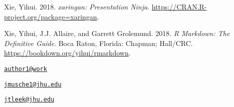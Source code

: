 \leavevmode\hypertarget{ref-xaringan}{}%
Xie, Yihui. 2018. \emph{xaringan: Presentation Ninja}.
\url{https://CRAN.R-project.org/package=xaringan}.

\leavevmode\hypertarget{ref-rmarkdownbook}{}%
Xie, Yihui, J.J. Allaire, and Garrett Grolemund. 2018. \emph{R Markdown:
The Definitive Guide}. Boca Raton, Florida: Chapman; Hall/CRC.
\url{https://bookdown.org/yihui/rmarkdown}.



\address{%
Sean Kross\\
Cognitive Science, University of California, San Diego\\
9500 Gilman Dr.\\ La Jolla, CA 92093\\
}
\href{mailto:author1@work}{\nolinkurl{author1@work}}

\address{%
John Muschelli\\
Department of Biostatistics, Johns Hopkins Bloomberg School of Public
Health\\
615 N Wolfe Street\\ Baltimore, MD 21231\\
}
\href{mailto:jmusche1@jhu.edu}{\nolinkurl{jmusche1@jhu.edu}}

\address{%
Jeffrey T. Leek\\
Department of Biostatistics, Johns Hopkins Bloomberg School of Public
Health\\
615 N Wolfe Street\\ Baltimore, MD 21231\\
}
\href{mailto:jtleek@jhu.edu}{\nolinkurl{jtleek@jhu.edu}}

